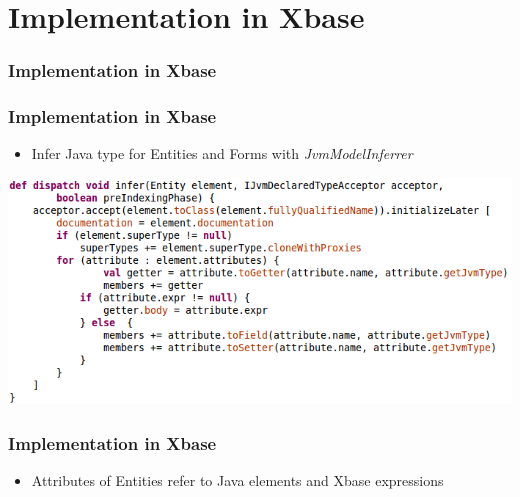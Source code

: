 \def \xbaseImpl {Implementation in Xbase}
\section[Xbase]{\xbaseImpl}

\begin{frame}
  \frametitle{\xbaseImpl}
  \tableofcontents[currentsection]
\end{frame}
  
\begin{frame}[fragile]
  \frametitle{\xbaseImpl}
  \begin{itemize}
    \item Infer Java type for Entities and Forms with
    \emph{JvmModelInferrer}
  \end{itemize}

  \includegraphics[width=1.1\textwidth]{img/xbase-infer.png}
\end{frame}    

\begin{frame}
  \frametitle{\xbaseImpl}
  \begin{itemize}
    \item Attributes of Entities refer to Java elements and Xbase expressions
   \end{itemize}
  \begin{footnotesize}
  
  \end{footnotesize}
\end{frame}
  

